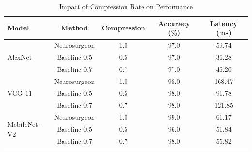 \begin{table}[htbp]
\centering
\caption{Impact of Compression Rate on Performance}
\label{tab:compression_analysis}
\begin{tabular}{lcccc}
\toprule
\textbf{Model} & \textbf{Method} & \textbf{Compression} & \textbf{Accuracy (\%)} & \textbf{Latency (ms)} \\
\midrule
\multirow{3}{*}{AlexNet}
 & Neurosurgeon & 1.0 & 97.0 & 59.74 \\
& Baseline-0.5 & 0.5 & 97.0 & 36.28 \\
& Baseline-0.7 & 0.7 & 97.0 & 45.20 \\
\midrule
\multirow{3}{*}{VGG-11}
 & Neurosurgeon & 1.0 & 98.0 & 168.47 \\
& Baseline-0.5 & 0.5 & 98.0 & 91.78 \\
& Baseline-0.7 & 0.7 & 98.0 & 121.85 \\
\midrule
\multirow{3}{*}{MobileNet-V2}
 & Neurosurgeon & 1.0 & 99.0 & 61.17 \\
& Baseline-0.5 & 0.5 & 96.0 & 51.84 \\
& Baseline-0.7 & 0.7 & 98.0 & 55.82 \\
\bottomrule
\end{tabular}
\end{table}
